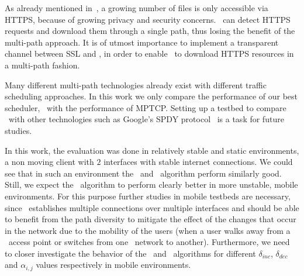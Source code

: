 As already mentioned in~, a growing number of files is only accessible via HTTPS, because of growing privacy and security concerns. 
\protonew~can detect HTTPS requests and download them through a single path, thus losing the benefit of the multi-path approach. 
It is of utmost importance to implement a transparent channel between SSL and \mhttp, in order to enable \mhttp~to download HTTPS resources in a multi-path fashion. 

Many different multi-path technologies already exist with different traffic scheduling approaches. 
In this work we only compare the performance of our best scheduler, \ie \algslice~with the performance of MPTCP. 
Setting up a testbed to compare \mhttp~with other technologies such as Google's SPDY protocol~\cite{BELSHE12-SPDY} is a task for future studies. 

In this work, the evaluation was done in relatively stable and static environments, \ie a non moving client with $2$ interfaces with stable internet connections. 
We could see that in such an environment the \algalpha~and \algslice~algorithm perform similarly good. 
Still, we expect the \algslice~algorithm to perform clearly better in more unstable, mobile environments. 
For this purpose further studies in mobile testbeds are necessary, since \mhttp~establishes multiple connections over multiple interfaces and should be able to benefit from the path diversity to mitigate the effect of the changes that occur in the network due to the mobility of the users (\eg when a user walks away from a \wifi~access point or switches from one \wifi~network to another). 
Furthermore, we need to closer investigate the behavior of the \algalpha~and \algslice~algorithms for different $\delta_{inc}$, $\delta_{dec}$ and $\alpha_{i,j}$ values respectively in mobile environments. 

